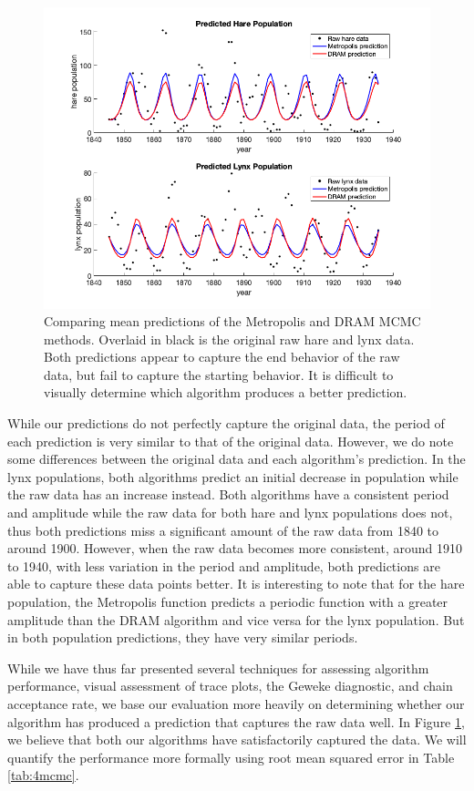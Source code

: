 \begin{figure}[H]
    \centering
    \includegraphics[width=15cm]{MCMC_figs/dram_mh_meanpredComp.png}
    \caption{Comparing mean predictions of the Metropolis and DRAM MCMC methods. Overlaid in black is the original raw hare and lynx data. Both predictions appear to capture the end behavior of the raw data, but fail to capture the starting behavior. It is difficult to visually determine which algorithm produces a better prediction.}
    \label{fig:13mcmc}
\end{figure}
While our predictions do not perfectly capture the original data, the period of each prediction is very similar to that of the original data. However, we do note some differences between the original data and each algorithm's prediction. In the lynx populations, both algorithms predict an initial decrease in population while the raw data has an increase instead. Both algorithms have a consistent period and amplitude while the raw data for both hare and lynx populations does not, thus both predictions miss a significant amount of the raw data from 1840 to around 1900. However, when the raw data becomes more consistent, around 1910 to 1940, with less variation in the period and amplitude, both predictions are able to capture these data points better. It is interesting to note that for the hare population, the Metropolis function predicts a periodic function with a greater amplitude than the DRAM algorithm and vice versa for the lynx population. But in both population predictions, they have very similar periods. 
\par While we have thus far presented several techniques for assessing algorithm performance, visual assessment of trace plots, the Geweke diagnostic, and chain acceptance rate, we base our evaluation more heavily on determining whether our algorithm has produced a prediction that captures the raw data well. In Figure \ref{fig:13mcmc}, we believe that both our algorithms have satisfactorily captured the data. We will quantify the performance more formally using root mean squared error in Table \ref{tab:4mcmc}.
